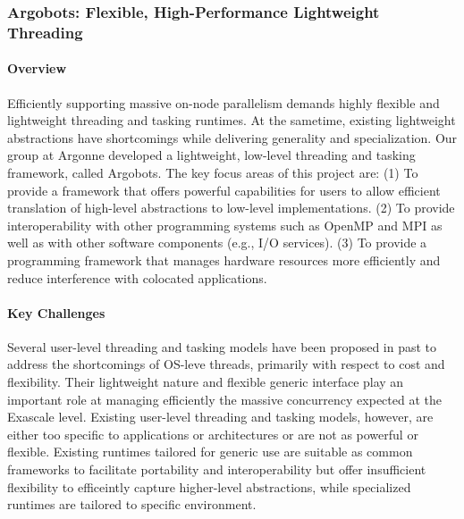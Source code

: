 \subsubsection{ Argobots: Flexible, High-Performance Lightweight Threading }

\paragraph{Overview}

Efficiently supporting massive on-node parallelism demands highly
flexible and lightweight threading and tasking runtimes. At the
sametime, existing lightweight abstractions have shortcomings while
delivering generality and specialization.  Our group at Argonne
developed a lightweight, low-level threading and tasking framework,
called Argobots.  The key focus areas of this project are: (1) To
provide a framework that offers powerful capabilities for users to
allow efficient translation of high-level abstractions to low-level
implementations. (2) To provide interoperability with other
programming systems such as OpenMP and MPI as well as with other
software components (e.g., I/O services). (3) To provide a programming
framework that manages hardware resources more efficiently and reduce
interference with colocated applications.

\paragraph{Key Challenges}

Several user-level threading and tasking models have been proposed in
past to address the shortcomings of OS-leve threads, primarily with
respect to cost and flexibility. Their lightweight nature and flexible
generic interface play an important role at managing efficiently the
massive concurrency expected at the Exascale level.  Existing
user-level threading and tasking models, however, are either too
specific to applications or architectures or are not as powerful or
flexible. Existing runtimes tailored for generic use \cite{GNUPth,
  PLDI97_Taura, COSET05_Thibault, COB14_Nakashima, MTAAP08_Wheeler,
  PPoPP99_Taura, SenSys06_Dunkels, TBB1, EuroPar08_Perache} are
suitable as common frameworks to facilitate portability and
interoperability but offer insufficient flexibility to efficeintly
capture higher-level abstractions, while specialized runtimes
\cite{ATC02_Adya, SolarisThreads, SOSP03_von_Behren, StateThreads,
  PLDI07_Li, MTAAP09_Porterfield, WMPP05_Cuvillo, IntelOMP, Nanos++,
  LCPC96_Kale, PACT14_Treichler} are tailored to specific environment.

